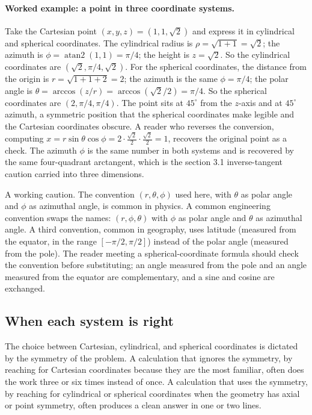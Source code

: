 \paragraph{Worked example: a point in three coordinate systems.}
Take the Cartesian point $(x, y, z) = (1, 1, \sqrt{2})$ and express
it in cylindrical and spherical coordinates. The cylindrical radius
is $\rho = \sqrt{1 + 1} = \sqrt{2}$; the azimuth is $\phi =
\operatorname{atan2}(1, 1) = \pi/4$; the height is $z = \sqrt{2}$.
So the cylindrical coordinates are $(\sqrt{2}, \pi/4, \sqrt{2})$. For
the spherical coordinates, the distance from the origin is $r =
\sqrt{1 + 1 + 2} = 2$; the azimuth is the same $\phi = \pi/4$; the
polar angle is $\theta = \arccos(z/r) = \arccos(\sqrt{2}/2) = \pi/4$.
So the spherical coordinates are $(2, \pi/4, \pi/4)$. The point sits
at $45^{\circ}$ from the $z$-axis and at $45^{\circ}$ azimuth, a
symmetric position that the spherical coordinates make legible and
the Cartesian coordinates obscure. A reader who reverses the
conversion, computing $x = r\sin\theta\cos\phi = 2 \cdot
\tfrac{\sqrt 2}{2} \cdot \tfrac{\sqrt 2}{2} = 1$, recovers the
original point as a check. The azimuth $\phi$ is the same number in
both systems and is recovered by the same four-quadrant arctangent,
which is the section 3.1 inverse-tangent caution carried into three
dimensions.

A working caution. The convention $(r, \theta, \phi)$ used here,
with $\theta$ as polar angle and $\phi$ as azimuthal angle, is
common in physics. A common engineering convention swaps the
names: $(r, \phi, \theta)$ with $\phi$ as polar angle and $\theta$
as azimuthal angle. A third convention, common in geography, uses
latitude (measured from the equator, in the range $[-\pi/2,
\pi/2]$) instead of the polar angle (measured from the pole). The
reader meeting a spherical-coordinate formula should check the
convention before substituting; an angle measured from the pole
and an angle measured from the equator are complementary, and a
sine and cosine are exchanged.

\subsection{When each system is right}

The choice between Cartesian, cylindrical, and spherical
coordinates is dictated by the symmetry of the problem. A
calculation that ignores the symmetry, by reaching for Cartesian
coordinates because they are the most familiar, often does the
work three or six times instead of once. A calculation that uses
the symmetry, by reaching for cylindrical or spherical coordinates
when the geometry has axial or point symmetry, often produces a
clean answer in one or two lines.

